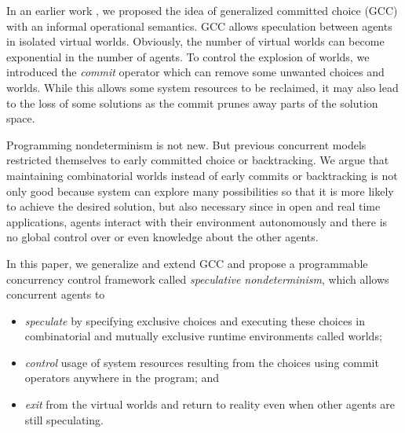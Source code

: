 In an earlier work \cite{JaffarYZ07}, we proposed the idea of
generalized committed choice (GCC) with an 
informal operational semantics. GCC allows speculation between agents in 
isolated virtual worlds. Obviously, the number of virtual worlds can 
become exponential in the number of agents. 
To control the explosion of worlds, 
we introduced the {\em commit} operator
which can remove some unwanted choices and worlds. 
While this allows some system resources to be reclaimed,
it may also lead to the loss of some solutions as the commit prunes away 
parts of the solution space.


Programming nondeterminism \cite{Floyd67} is not new. But previous 
concurrent models restricted themselves to early
committed choice \cite{Shapiro89:CLP-survey} or backtracking.
We argue that maintaining combinatorial worlds 
instead of early commits or backtracking \cite{DantsinEGV01}
is not only good because system can explore many possibilities so that it is
more likely to achieve the desired solution,
but also necessary since in open and real time applications, agents
interact with their environment autonomously and there is no global control
over or even knowledge about the other agents. 

In this paper, we generalize and extend GCC and
propose a programmable concurrency control framework called 
{\em speculative nondeterminism}, which allows concurrent agents to
\begin{itemize}
\item {\em speculate} by specifying exclusive choices and executing these
choices in combinatorial and mutually exclusive runtime environments called
worlds;
\item {\em control} usage of system resources resulting from the choices
using commit operators anywhere in the program; and
\item {\em exit} from the virtual worlds and return to reality even when
other agents are still speculating.
\end{itemize}


